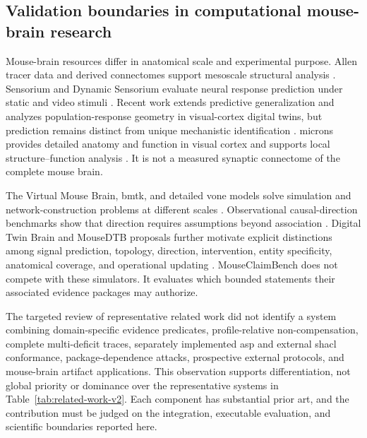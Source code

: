 \subsection{Validation boundaries in computational mouse-brain research}
\label{subsec:mouse-boundaries}

Mouse-brain resources differ in anatomical scale and experimental purpose. Allen tracer data and derived connectomes support mesoscale structural analysis \citep{oh2014mesoscale,knox2019connectome}. Sensorium and Dynamic Sensorium evaluate neural response prediction under static and video stimuli \citep{willeke2022sensorium,turishcheva2023dynamic,turishcheva2024retrospective}. Recent work extends predictive generalization and analyzes population-response geometry in visual-cortex digital twins, but prediction remains distinct from unique mechanistic identification \citep{wang2025foundation,liscai2025population}. \ac{microns} provides detailed anatomy and function in visual cortex and supports local structure--function analysis \citep{bae2025microns,ding2025wiring}. It is not a measured synaptic connectome of the complete mouse brain.

The Virtual Mouse Brain, \ac{bmtk}, and detailed \ac{vone} models solve simulation and network-construction problems at different scales \citep{melozzi2017virtualmouse,dai2020bmtk,billeh2020v1}. Observational causal-direction benchmarks show that direction requires assumptions beyond association \citep{mooij2016cause}. Digital Twin Brain and MouseDTB proposals further motivate explicit distinctions among signal prediction, topology, direction, intervention, entity specificity, anatomical coverage, and operational updating \citep{xiong2023dtb,chen2026mousedtb}. MouseClaimBench does not compete with these simulators. It evaluates which bounded statements their associated evidence packages may authorize.

The targeted review of representative related work did not identify a system combining domain-specific evidence predicates, profile-relative non-compensation, complete multi-deficit traces, separately implemented \ac{asp} and external \ac{shacl} conformance, package-dependence attacks, prospective external protocols, and mouse-brain artifact applications. This observation supports differentiation, not global priority or dominance over the representative systems in Table~\ref{tab:related-work-v2}. Each component has substantial prior art, and the contribution must be judged on the integration, executable evaluation, and scientific boundaries reported here.

